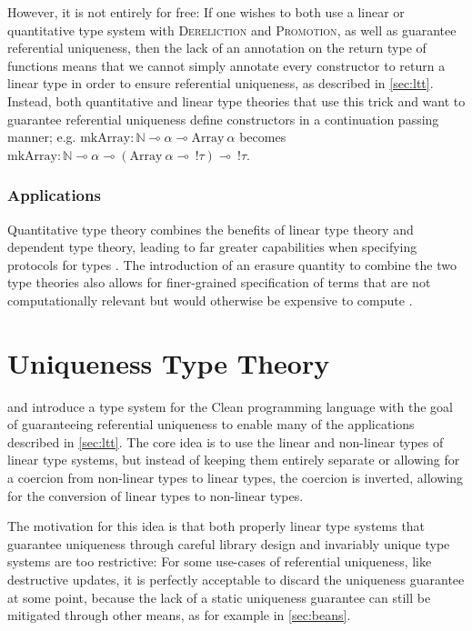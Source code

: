 However, it is not entirely for free: If one wishes to both use a linear or quantitative type system with \textsc{Dereliction} and \textsc{Promotion}, as well as guarantee referential uniqueness, then the lack of an annotation on the return type of functions means that we cannot simply annotate every constructor to return a linear type in order to ensure referential uniqueness, as described in \cref{sec:ltt}. 
Instead, both quantitative and linear type theories that use this trick and want to guarantee referential uniqueness define constructors in a continuation passing manner; e.g. $\mathrm{mkArray} : \mathbb{N} \multimap \alpha \multimap \mathrm{Array}\ \alpha$ becomes $\mathrm{mkArray} : \mathbb{N} \multimap \alpha \multimap (\mathrm{Array}\ \alpha \multimap\ !\tau) \multimap\ !\tau$.

\subsubsection{Applications}
Quantitative type theory combines the benefits of linear type theory and dependent type theory, leading to far greater capabilities when specifying protocols for types \citep{brady_idris_2021}. The introduction of an erasure quantity to combine the two type theories also allows for finer-grained specification of terms that are not computationally relevant but would otherwise be expensive to compute \citep{brady_idris_2021}.

\section{Uniqueness Type Theory}\label{sec:uniqueness}
\cite{smetsers_guaranteeing_1994} and \cite{barendsen_uniqueness_1996} introduce a type system for the Clean programming language with the goal of guaranteeing referential uniqueness to enable many of the applications described in \cref{sec:ltt}. The core idea is to use the linear and non-linear types of linear type systems, but instead of keeping them entirely separate or allowing for a coercion from non-linear types to linear types, the coercion is inverted, allowing for the conversion of linear types to non-linear types. 

The motivation for this idea is that both properly linear type systems that guarantee uniqueness through careful library design and invariably unique type systems are too restrictive: For some use-cases of referential uniqueness, like destructive updates, it is perfectly acceptable to discard the uniqueness guarantee at some point, because the lack of a static uniqueness guarantee can still be mitigated through other means, as for example in \cref{sec:beans}. 

